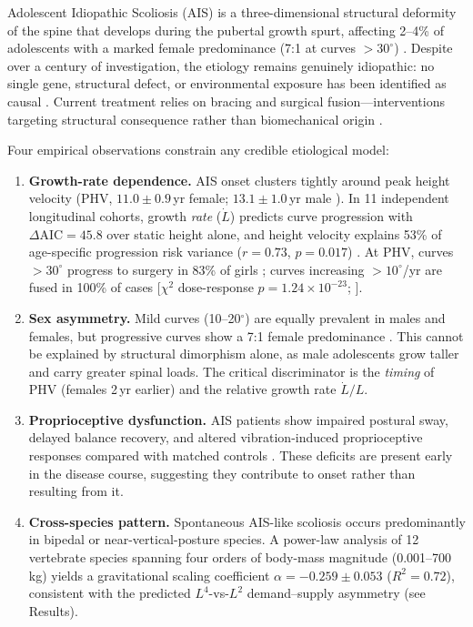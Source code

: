 \documentclass[12pt, letterpaper]{article}
\newcommand{\dLdt}{\dot{L}/L}
\newcommand{\DAIC}{\Delta\mathrm{AIC}}
\begin{document}
Adolescent Idiopathic Scoliosis (AIS) is a three-dimensional structural
deformity of the spine that develops during the pubertal growth spurt, affecting
2--4\% of adolescents with a marked female predominance (7:1 at curves
$>30^{\circ}$) \citep{Weinstein2008, ChengNRDP2015}. Despite over a century of
investigation, the etiology remains genuinely idiopathic: no single gene,
structural defect, or environmental exposure has been identified as causal
\citep{ChengNRDP2015, Gorman2012}. Current treatment relies on bracing and
surgical fusion---interventions targeting structural consequence rather than
biomechanical origin \citep{Weinstein2013}.

Four empirical observations constrain any credible etiological model:

\begin{enumerate}[label=\arabic*.]
  \item \textbf{Growth-rate dependence.} AIS onset clusters tightly around peak
    height velocity (PHV, $11.0 \pm 0.9$\,yr female; $13.1 \pm 1.0$\,yr male
    \citealt{Tanner1966, Sanders2007}). In 11 independent longitudinal cohorts,
    growth \emph{rate} ($\dot{L}$) predicts curve progression with
    $\DAIC = 45.8$ over static height alone, and height velocity explains 53\%
    of age-specific progression risk variance ($r = 0.73$, $p = 0.017$)
    \citep{Little2000, Sanders2008, Charles2006, Tan2016}. At PHV, curves
    $>30^{\circ}$ progress to surgery in 83\% of girls \citep{Little2000};
    curves increasing $>10^{\circ}$/yr are fused in 100\% of cases
    [$\chi^{2}$ dose-response $p = 1.24\times10^{-23}$; \citealt{Charles2006}].

  \item \textbf{Sex asymmetry.} Mild curves (10--20$^{\circ}$) are equally
    prevalent in males and females, but progressive curves show a 7:1 female
    predominance \citep{Weinstein2008}. This cannot be explained by structural
    dimorphism alone, as male adolescents grow taller and carry greater spinal
    loads. The critical discriminator is the \emph{timing} of PHV (females
    2\,yr earlier) and the relative growth rate $\dLdt$.

  \item \textbf{Proprioceptive dysfunction.} AIS patients show impaired postural
    sway, delayed balance recovery, and altered vibration-induced proprioceptive
    responses compared with matched controls
    \citep{Mallau2007, Chow2006, Kinel2018}. These deficits are present early in
    the disease course, suggesting they contribute to onset rather than
    resulting from it.

  \item \textbf{Cross-species pattern.} Spontaneous AIS-like scoliosis occurs
    predominantly in bipedal or near-vertical-posture species. A power-law
    analysis of 12 vertebrate species spanning four orders of body-mass magnitude
    (0.001--700\,kg) yields a gravitational scaling coefficient
    $\alpha = -0.259 \pm 0.053$ ($R^{2} = 0.72$), consistent with the
    predicted $L^{4}$-vs-$L^{2}$ demand--supply asymmetry (see Results).
\end{enumerate}
\end{document}
